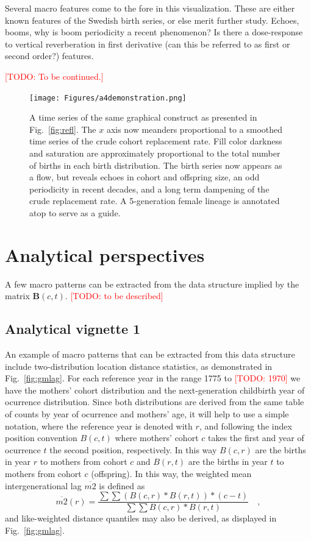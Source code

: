 \documentclass{article}
\renewcommand{\todo}[1]{\textcolor{red}{[TODO: #1]}}
\begin{document}
Several macro features come to the fore in this visualization. These are either known features of the Swedish birth series, or else merit further study. Echoes, booms, why is boom periodicity a recent phenomenon? Is there a dose-response to vertical reverberation in first derivative (can this be referred to as first or second order?) features.

\todo{To be continued.}

\begin{figure}
\texttt{[image: Figures/a4demonstration.png]}
%
\caption{A time series of the same graphical construct as presented in Fig.~\ref{fig:refl}. The $x$ axis now meanders proportional to a smoothed time series of the crude cohort replacement rate. Fill color darkness and saturation are approximately proportional to the total number of births in each birth distribution. The birth series now appears as a flow, but reveals echoes in cohort and offspring size, an odd periodicity in recent decades, and a long term dampening of the crude replacement rate. A 5-generation female lineage is annotated atop to serve as a guide.}
\label{fig:foldout}
\end{figure}

\section{Analytical perspectives}
A few macro patterns can be extracted from the data structure implied by the matrix $\mathbf{B}(c,t)$. \todo{to be described}

\subsection{Analytical vignette 1}
An example of macro patterns that can be extracted from this data structure include two-distribution location distance statistics, as demonstrated in Fig.~\ref{fig:gmlag}. For each reference year in the range 1775 to \todo{1970} we have the mothers' cohort distribution and the next-generation childbirth year of ocurrence distribution. Since both distributions are derived from the same table of counts by year of ocurrence and mothers' age, it will help to use a simple notation, where the reference year is denoted with $r$, and following the index position convention $B(c,t)$ where mothers' cohort $c$ takes the first and year of ocurrence $t$ the second position, respectively. In this way $B(c,r)$ are the births in year $r$ to mothers from cohort $c$ and $B(r,t)$ are the births in year $t$ to mothers from cohort $c$ (offspring). In this way, the weighted mean intergenerational lag $\overline{m2}$ is defined as
\begin{equation}
\overline{m2}(r) = \frac{\sum\sum (B(c,r)*B(r,t)) * (c - t)}{\sum\sum B(c,r)*B(r,t)} \quad \mathrm{,}
\end{equation}
and like-weighted distance quantiles may also be derived, as displayed in Fig.~\ref{fig:gmlag}.
\end{document}
